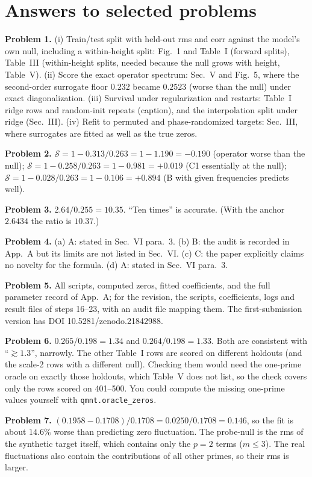 \section{Answers to selected problems}\label{sec:paper-critique-answers}

\textbf{Problem 1.} (i) Train/test split with held-out rms and corr against the model's own null, including a within-height split: Fig.~1 and Table~I (forward splits), Table~III (within-height splits, needed because the null grows with height, Table~V). (ii) Score the exact operator spectrum: Sec.~V and Fig.~5, where the second-order surrogate floor $0.232$ became $0.2523$ (worse than the null) under exact diagonalization. (iii) Survival under regularization and restarts: Table~I ridge rows and random-init repeats (caption), and the interpolation split under ridge (Sec.~III). (iv) Refit to permuted and phase-randomized targets: Sec.~III, where surrogates are fitted as well as the true zeros.

\textbf{Problem 2.} $\mathcal S=1-0.313/0.263=1-1.190=-0.190$ (operator worse than the null); $\mathcal S=1-0.258/0.263=1-0.981=+0.019$ (C1 essentially at the null); $\mathcal S=1-0.028/0.263=1-0.106=+0.894$ (B with given frequencies predicts well).

\textbf{Problem 3.} $2.64/0.255=10.35$. ``Ten times'' is accurate. (With the anchor $2.6434$ the ratio is $10.37$.)

\textbf{Problem 4.} (a) A: stated in Sec.~VI para.~3. (b) B: the audit is recorded in App.~A but its limits are not listed in Sec.~VI. (c) C: the paper explicitly claims no novelty for the formula. (d) A: stated in Sec.~VI para.~3.

\textbf{Problem 5.} All scripts, computed zeros, fitted coefficients, and the full parameter record of App.~A; for the revision, the scripts, coefficients, logs and result files of steps 16--23, with an audit file mapping them. The first-submission version has DOI 10.5281/zenodo.21842988.

\textbf{Problem 6.} $0.265/0.198=1.34$ and $0.264/0.198=1.33$. Both are consistent with ``$\gtrsim1.3$'', narrowly. The other Table~I rows are scored on different holdouts (and the scale-2 rows with a different null). Checking them would need the one-prime oracle on exactly those holdouts, which Table~V does not list, so the check covers only the rows scored on 401--500. You could compute the missing one-prime values yourself with \texttt{qmnt.oracle\_zeros}.

\textbf{Problem 7.} $(0.1958-0.1708)/0.1708=0.0250/0.1708=0.146$, so the fit is about $14.6\%$ worse than predicting zero fluctuation. The probe-null is the rms of the synthetic target itself, which contains only the $p=2$ terms ($m\le3$). The real fluctuations also contain the contributions of all other primes, so their rms is larger.

